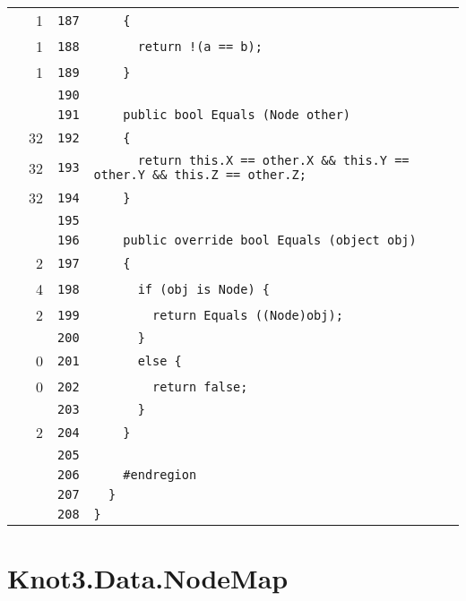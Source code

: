 \documentclass[a4paper,10pt]{article}
\begin{document}
\begin{longtable}[l]{lrrl}
\cellcolor{green} & 1 & \verb~187~ & \verb~    {~\\
\cellcolor{green} & 1 & \verb~188~ & \verb~      return !(a == b);~\\
\cellcolor{green} & 1 & \verb~189~ & \verb~    }~\\
\cellcolor{gray} &  & \verb~190~ & \verb~~\\
\cellcolor{gray} &  & \verb~191~ & \verb~    public bool Equals (Node other)~\\
\cellcolor{green} & 32 & \verb~192~ & \verb~    {~\\
\cellcolor{green} & 32 & \verb~193~ & \verb~      return this.X == other.X && this.Y == other.Y && this.Z == other.Z;~\\
\cellcolor{green} & 32 & \verb~194~ & \verb~    }~\\
\cellcolor{gray} &  & \verb~195~ & \verb~~\\
\cellcolor{gray} &  & \verb~196~ & \verb~    public override bool Equals (object obj)~\\
\cellcolor{green} & 2 & \verb~197~ & \verb~    {~\\
\cellcolor{green} & 4 & \verb~198~ & \verb~      if (obj is Node) {~\\
\cellcolor{green} & 2 & \verb~199~ & \verb~        return Equals ((Node)obj);~\\
\cellcolor{gray} &  & \verb~200~ & \verb~      }~\\
\cellcolor{red} & 0 & \verb~201~ & \verb~      else {~\\
\cellcolor{red} & 0 & \verb~202~ & \verb~        return false;~\\
\cellcolor{gray} &  & \verb~203~ & \verb~      }~\\
\cellcolor{green} & 2 & \verb~204~ & \verb~    }~\\
\cellcolor{gray} &  & \verb~205~ & \verb~~\\
\cellcolor{gray} &  & \verb~206~ & \verb~    #endregion~\\
\cellcolor{gray} &  & \verb~207~ & \verb~  }~\\
\cellcolor{gray} &  & \verb~208~ & \verb~}~\\
\end{longtable}
\newpage
\section{Knot3.Data.NodeMap}
\end{document}
